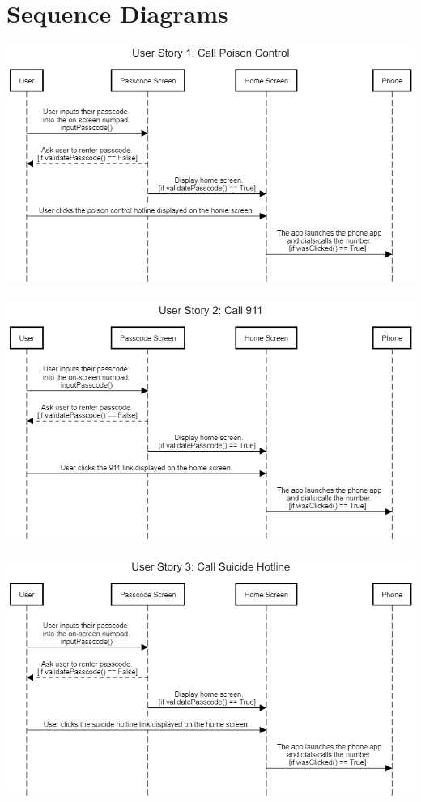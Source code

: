 \documentclass[letterpaper,12pt,titlepage]{article}
\begin{document}
\newpage
\section{Sequence Diagrams}
\includegraphics[scale=.45]{User_Story_1__Call_Poison_Control}~\cite{seqdia}
\newline
\newline
\includegraphics[scale=.45]{User_Story_2__Call_911}~\cite{seqdia}
\newline
\newline
\includegraphics[scale=.45]{User_Story_3__Call_Suicide_Hotline}~\cite{seqdia}
\end{document}
